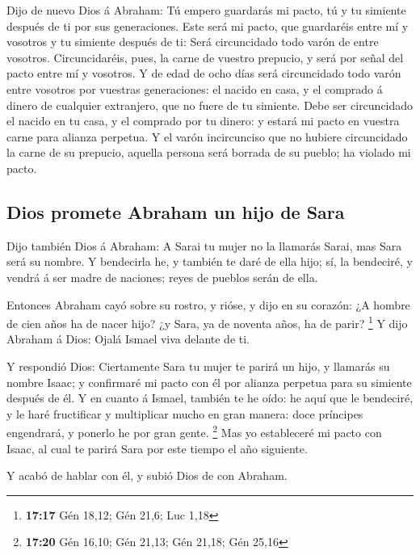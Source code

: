  Dijo de nuevo Dios á Abraham: Tú empero guardarás mi pacto,
tú y tu simiente después de ti por sus generaciones.  Este
será mi pacto, que guardaréis entre mí y vosotros y tu simiente después
de ti: Será circuncidado todo varón de entre vosotros. 
Circuncidaréis, pues, la carne de vuestro prepucio, y será por señal del
pacto entre mí y vosotros.  Y de edad de ocho días será
circuncidado todo varón entre vosotros por vuestras generaciones: el
nacido en casa, y el comprado á dinero de cualquier extranjero, que no
fuere de tu simiente.  Debe ser circuncidado el nacido en
tu casa, y el comprado por tu dinero: y estará mi pacto en vuestra carne
para alianza perpetua.  Y el varón incircunciso que no
hubiere circuncidado la carne de su prepucio, aquella persona será
borrada de su pueblo; ha violado mi pacto.

\hypertarget{dios-promete-abraham-un-hijo-de-sara}{%
\subsection{Dios promete Abraham un hijo de
Sara}\label{dios-promete-abraham-un-hijo-de-sara}}

 Dijo también Dios á Abraham: A Sarai tu mujer no la
llamarás Sarai, mas Sara será su nombre.  Y bendecirla he,
y también te daré de ella hijo; sí, la bendeciré, y vendrá á ser madre
de naciones; reyes de pueblos serán de ella.

 Entonces Abraham cayó sobre su rostro, y rióse, y dijo en
su corazón: ¿A hombre de cien años ha de nacer hijo? ¿y Sara, ya de
noventa años, ha de parir? \footnote{\textbf{17:17} Gén 18,12; Gén 21,6;
  Luc 1,18}  Y dijo Abraham á Dios: Ojalá Ismael viva
delante de ti.

 Y respondió Dios: Ciertamente Sara tu mujer te parirá un
hijo, y llamarás su nombre Isaac; y confirmaré mi pacto con él por
alianza perpetua para su simiente después de él.  Y en
cuanto á Ismael, también te he oído: he aquí que le bendeciré, y le haré
fructificar y multiplicar mucho en gran manera: doce príncipes
engendrará, y ponerlo he por gran gente. \footnote{\textbf{17:20} Gén
  16,10; Gén 21,13; Gén 21,18; Gén 25,16}  Mas yo
estableceré mi pacto con Isaac, al cual te parirá Sara por este tiempo
el año siguiente.

 Y acabó de hablar con él, y subió Dios de con Abraham.

